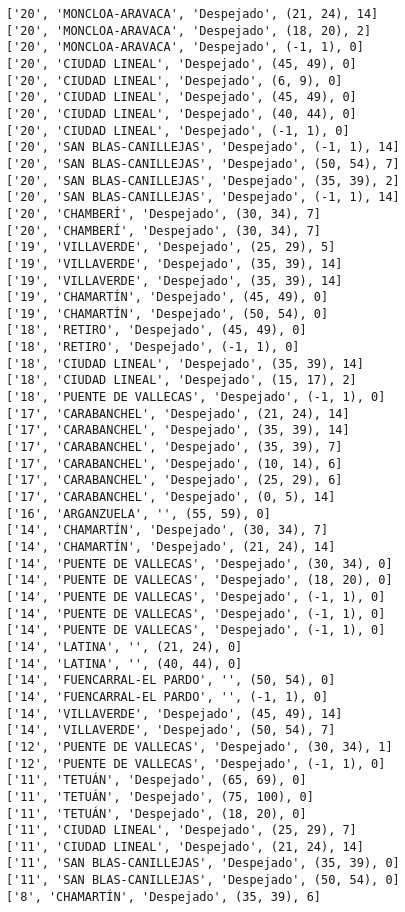 \documentclass[11pt]{article}
\begin{document}
\begin{Verbatim}[commandchars=\\\{\}]
['20', 'MONCLOA-ARAVACA', 'Despejado', (21, 24), 14]
['20', 'MONCLOA-ARAVACA', 'Despejado', (18, 20), 2]
['20', 'MONCLOA-ARAVACA', 'Despejado', (-1, 1), 0]
['20', 'CIUDAD LINEAL', 'Despejado', (45, 49), 0]
['20', 'CIUDAD LINEAL', 'Despejado', (6, 9), 0]
['20', 'CIUDAD LINEAL', 'Despejado', (45, 49), 0]
['20', 'CIUDAD LINEAL', 'Despejado', (40, 44), 0]
['20', 'CIUDAD LINEAL', 'Despejado', (-1, 1), 0]
['20', 'SAN BLAS-CANILLEJAS', 'Despejado', (-1, 1), 14]
['20', 'SAN BLAS-CANILLEJAS', 'Despejado', (50, 54), 7]
['20', 'SAN BLAS-CANILLEJAS', 'Despejado', (35, 39), 2]
['20', 'SAN BLAS-CANILLEJAS', 'Despejado', (-1, 1), 14]
['20', 'CHAMBERÍ', 'Despejado', (30, 34), 7]
['20', 'CHAMBERÍ', 'Despejado', (30, 34), 7]
['19', 'VILLAVERDE', 'Despejado', (25, 29), 5]
['19', 'VILLAVERDE', 'Despejado', (35, 39), 14]
['19', 'VILLAVERDE', 'Despejado', (35, 39), 14]
['19', 'CHAMARTÍN', 'Despejado', (45, 49), 0]
['19', 'CHAMARTÍN', 'Despejado', (50, 54), 0]
['18', 'RETIRO', 'Despejado', (45, 49), 0]
['18', 'RETIRO', 'Despejado', (-1, 1), 0]
['18', 'CIUDAD LINEAL', 'Despejado', (35, 39), 14]
['18', 'CIUDAD LINEAL', 'Despejado', (15, 17), 2]
['18', 'PUENTE DE VALLECAS', 'Despejado', (-1, 1), 0]
['17', 'CARABANCHEL', 'Despejado', (21, 24), 14]
['17', 'CARABANCHEL', 'Despejado', (35, 39), 14]
['17', 'CARABANCHEL', 'Despejado', (35, 39), 7]
['17', 'CARABANCHEL', 'Despejado', (10, 14), 6]
['17', 'CARABANCHEL', 'Despejado', (25, 29), 6]
['17', 'CARABANCHEL', 'Despejado', (0, 5), 14]
['16', 'ARGANZUELA', '', (55, 59), 0]
['14', 'CHAMARTÍN', 'Despejado', (30, 34), 7]
['14', 'CHAMARTÍN', 'Despejado', (21, 24), 14]
['14', 'PUENTE DE VALLECAS', 'Despejado', (30, 34), 0]
['14', 'PUENTE DE VALLECAS', 'Despejado', (18, 20), 0]
['14', 'PUENTE DE VALLECAS', 'Despejado', (-1, 1), 0]
['14', 'PUENTE DE VALLECAS', 'Despejado', (-1, 1), 0]
['14', 'PUENTE DE VALLECAS', 'Despejado', (-1, 1), 0]
['14', 'LATINA', '', (21, 24), 0]
['14', 'LATINA', '', (40, 44), 0]
['14', 'FUENCARRAL-EL PARDO', '', (50, 54), 0]
['14', 'FUENCARRAL-EL PARDO', '', (-1, 1), 0]
['14', 'VILLAVERDE', 'Despejado', (45, 49), 14]
['14', 'VILLAVERDE', 'Despejado', (50, 54), 7]
['12', 'PUENTE DE VALLECAS', 'Despejado', (30, 34), 1]
['12', 'PUENTE DE VALLECAS', 'Despejado', (-1, 1), 0]
['11', 'TETUÁN', 'Despejado', (65, 69), 0]
['11', 'TETUÁN', 'Despejado', (75, 100), 0]
['11', 'TETUÁN', 'Despejado', (18, 20), 0]
['11', 'CIUDAD LINEAL', 'Despejado', (25, 29), 7]
['11', 'CIUDAD LINEAL', 'Despejado', (21, 24), 14]
['11', 'SAN BLAS-CANILLEJAS', 'Despejado', (35, 39), 0]
['11', 'SAN BLAS-CANILLEJAS', 'Despejado', (50, 54), 0]
['8', 'CHAMARTÍN', 'Despejado', (35, 39), 6]

\end{Verbatim}
\end{document}
